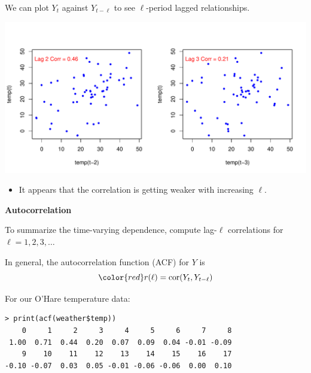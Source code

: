 \documentclass[12pt,xcolor=svgnames]{beamer}
\newcommand{\rd}{\color{red}}
\newcommand{\bl}{\color{blue}}
\newcommand{\theme}{\color{FireBrick}}
\newcommand{\mr}[1]{\mathrm{#1}}
\newcommand{\sk}{\vspace{.4cm}}
\newcommand{\nochap}{\vspace{0.5cm}}
\newcommand{\nsk}{\vspace{-.4cm}}
\newcommand{\chap}[1]{{\theme \Large \bf #1} \sk}
\begin{document}
\begin{frame}
\nochap

 We can plot $Y_t$ against $Y_{t-\ell}$ to see {\rd $\ell$-period lagged relationships}.
\begin{center}
\includegraphics[scale=0.5,trim=10 25 0 70]{lagtemp_new}
\end{center}

\begin{itemize}
\item It appears that the correlation is getting weaker with increasing $\ell$.
\end{itemize}

\end{frame}


\begin{frame}[fragile]
\chap{Autocorrelation}

To summarize the time-varying dependence, compute lag-$\ell$ correlations for
$\ell=1,2,3,\ldots$

\sk
In general, the autocorrelation function (ACF) for $Y$ is
\[\rd
r(\ell) = \mr{cor}(Y_t, Y_{t-\ell})
\]

\vspace{-0.55cm}
For our O'Hare temperature data:

{\footnotesize \bl 
\begin{verbatim}
> print(acf(weather$temp)) 
    0     1     2     3     4     5     6     7     8 
 1.00  0.71  0.44  0.20  0.07  0.09  0.04 -0.01 -0.09 
    9    10    11    12    13    14    15    16    17 
-0.10 -0.07  0.03  0.05 -0.01 -0.06 -0.06  0.00  0.10 
\end{verbatim}
}

\nsk
\end{frame}
\end{document}
